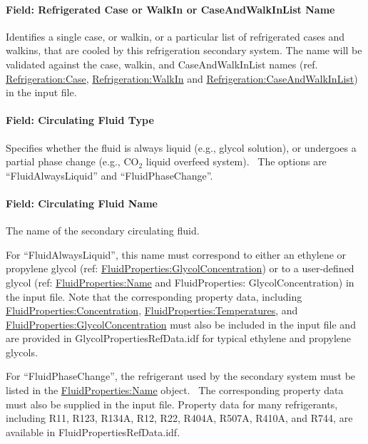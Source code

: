 \paragraph{Field: Refrigerated Case or WalkIn or CaseAndWalkInList Name}\label{field-refrigerated-case-or-walkin-or-caseandwalkinlist-name-1}

Identifies a single case, or walkin, or a particular list of refrigerated cases and walkins, that are cooled by this refrigeration secondary system. The name will be validated against the case, walkin, and CaseAndWalkInList names (ref. \hyperref[refrigerationcase]{Refrigeration:Case}, \hyperref[refrigerationwalkin]{Refrigeration:WalkIn} and \hyperref[refrigerationcaseandwalkinlist]{Refrigeration:CaseAndWalkInList}) in the input file.

\paragraph{Field: Circulating Fluid Type}\label{field-circulating-fluid-type}

Specifies whether the fluid is always liquid (e.g., glycol solution), or undergoes a partial phase change (e.g., CO\(_{2}\) liquid overfeed system).~ The options are ``FluidAlwaysLiquid'' and ``FluidPhaseChange''.

\paragraph{Field: Circulating Fluid Name}\label{field-circulating-fluid-name}

The name of the secondary circulating fluid.

For ``FluidAlwaysLiquid'', this name must correspond to either an ethylene or propylene glycol (ref: \hyperref[fluidpropertiesglycolconcentration]{FluidProperties:GlycolConcentration}) or to a user-defined glycol (ref: \hyperref[fluidpropertiesname]{FluidProperties:Name} and FluidProperties: GlycolConcentration) in the input file. Note that the corresponding property data, including \hyperref[fluidpropertiesconcentration]{FluidProperties:Concentration}, \hyperref[fluidpropertiestemperatures]{FluidProperties:Temperatures}, and \hyperref[fluidpropertiesglycolconcentration]{FluidProperties:GlycolConcentration} must also be included in the input file and are provided in GlycolPropertiesRefData.idf for typical ethylene and propylene glycols.

For ``FluidPhaseChange'', the refrigerant used by the secondary system must be listed in the \hyperref[fluidpropertiesname]{FluidProperties:Name} object.~ The corresponding property data must also be supplied in the input file. Property data for many refrigerants, including R11, R123, R134A, R12, R22, R404A, R507A, R410A, and R744, are available in FluidPropertiesRefData.idf.

